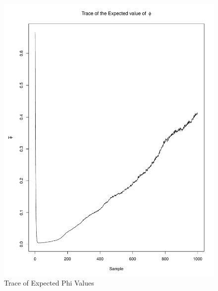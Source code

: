 \documentclass[11pt]{labbook}
\begin{document}
    \begin{figure}
        \centering
        \includegraphics[scale=.65]{FONSE_Plots/2016/December_8/expectedPhi_trace}
        \caption{Trace of Expected Phi Values}
        \label{fig:DEC8_EPHI}
    \end{figure}
\end{document}
